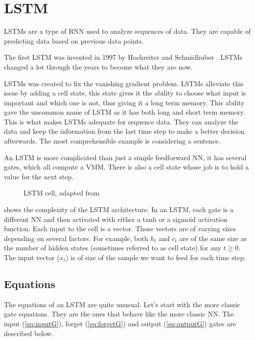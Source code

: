 \section{\acs{LSTM}}\label{sec:lstm}
\acfp{LSTM} are a type of \ac{RNN} used to analyze sequences of data. They are capable of predicting data based on previous data points.

The first \ac{LSTM} was invented in 1997 by Hochreiter and Schmidhuber \cite{firstLSTM}. \acp{LSTM} changed a lot through the years to become what they are now.

\acp{LSTM} was created to fix the vanishing gradient problem. \acp{LSTM} alleviate this issue by adding a cell state, this state gives it the ability to choose what input is important and which one is not, thus giving it a long term memory. This ability gave the uncommon name of \acl{LSTM} as it has both long and short term memory. This is what makes \acp{LSTM} adequate for sequence data. They can analyze the data and keep the information from the last time step to make a better decision afterwards. The most comprehensible example is considering a sentence. %

An \ac{LSTM} is more complicated than just a simple feedforward \acl{NN}, it has several gates, which all compute a \ac{VMM}. There is also a cell state whose job is to hold a value for the next step.

\begin{figure}[H]
  \centering
  
  \label{fig:lstmCell}
  \caption{\acs{LSTM} cell, adapted from \cite{wikiLSTM}}
\end{figure}

 shows the complexity of the \ac{LSTM} architecture. In an \ac{LSTM}, each gate is a different \ac{NN} and then activated with either a \ac{tanh} or a sigmoid activation function. Each input to the cell is a vector.
Those vectors are of varying sizes depending on several factors. For example, both $h_t$ and $c_t$ are of the same size as the number of hidden states (sometimes referred to as cell state) for any $t\geq 0$.
The input vector ($x_t$) is of size of the sample we want to feed for each time step.

\subsection{Equations}

The equations of an LSTM are quite unusual.
Let's start with the more classic gate equations. They are the ones that behave like the more classic \ac{NN}.
The input (\cref{eq:inputG}), forget (\cref{eq:forgetG}) and output (\cref{eq:outputG}) gates are described below.


